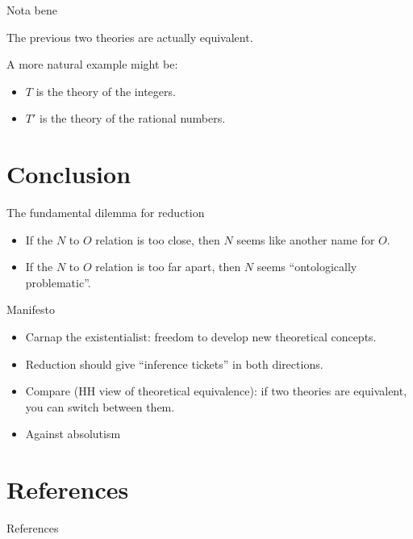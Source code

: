\documentclass[fleqn]{beamer}
\begin{document}
\begin{frame}{Nota bene}

  The previous two theories are actually equivalent.

  A more natural example might be:

  \begin{itemize}
  \item $T$ is the theory of the integers.
  \item $T'$ is the theory of the rational numbers.
  \end{itemize}



\end{frame}




\section{Conclusion}




\begin{frame}{The fundamental dilemma for reduction}

  \begin{itemize}
  \item If the $N$ to $O$ relation is too close, then $N$ seems like
    another name for $O$.
  \item If the $N$ to $O$ relation is too far apart, then $N$ seems
    ``ontologically problematic''.
  \end{itemize}


\end{frame}


\begin{frame}{Manifesto}

  \begin{itemize}
  \item Carnap the existentialist: freedom to develop new theoretical
    concepts.
  \item Reduction should give ``inference tickets'' in both
    directions.
  \item Compare (HH view of theoretical equivalence): if two theories
    are equivalent, you can switch between them.
  \item Against absolutism
  \end{itemize}



\end{frame}

\section{References}


\begin{frame}[allowframebreaks]{References}

\printbibliography[heading=none]

\end{frame}


\end{document}
